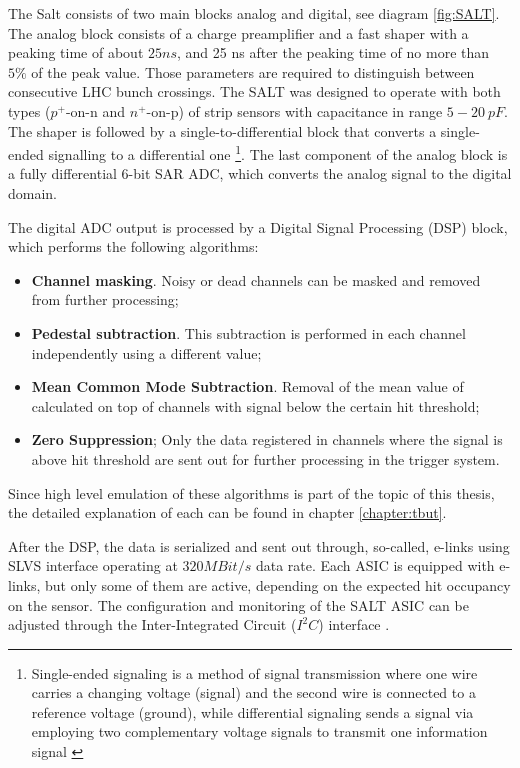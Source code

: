 The Salt consists of two main blocks analog and digital, see diagram \ref{fig:SALT}. The analog block consists of a charge preamplifier and a fast shaper with a peaking time of about $25 ns$, and 25 ns after the peaking time of no more than $5\%$ of the peak value.  Those parameters are required to distinguish between consecutive LHC bunch crossings. The SALT was designed to operate with both types ($p^{+}\text{-on-n}$ and $n^{+}\text{-on-p}$) of strip sensors with capacitance in range $5-20~ pF$. 
The shaper is followed by a single-to-differential block that converts a single-ended signalling to a differential one \footnote{Single-ended signaling is a method of signal transmission where one wire carries a changing voltage (signal) and the second wire is connected to a reference voltage (ground), while differential signaling sends a signal via employing two complementary voltage signals to transmit one information signal \cite{signals}}. The last component of the analog block is a fully differential 6-bit SAR ADC, which converts the analog signal to the digital domain. 

The digital ADC output is processed by a Digital Signal Processing (DSP) block, which performs the following algorithms: 

\begin{itemize}
    \item \textbf{Channel masking}. Noisy or dead channels can be masked and removed from further processing; 
    \item \textbf{Pedestal subtraction}. This subtraction is performed in each channel independently using a different value;
    \item \textbf{Mean Common Mode Subtraction}. Removal of the mean value of calculated on top of channels with signal below the certain hit threshold; 
    \item \textbf{Zero Suppression}; Only the data registered in channels where the signal is above hit threshold are sent out for further processing in the trigger system.
\end{itemize}

Since high level emulation of these algorithms is part of the topic of this thesis, the detailed explanation of each can be found in chapter \ref{chapter:tbut}. 

After the DSP, the data is serialized and sent out through, so-called, e-links using SLVS interface \cite{SLVS} operating at $320 MBit/s$ data rate. Each ASIC is equipped with  e-links, but only some of them are active, depending on the expected hit occupancy on the sensor.  The configuration and monitoring of the SALT ASIC can be adjusted through the Inter-Integrated
Circuit ($I^{2}C$) interface \cite{i2c}.  

